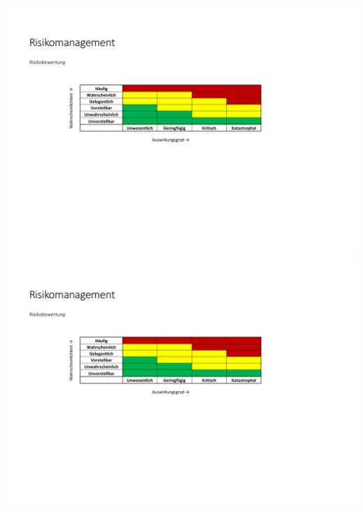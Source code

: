 \begin{landscape}
			\newpage  			
			\includegraphics[page=4,scale=0.90,clip,trim=17mm 22mm 21mm 22mm]{Anhangsdokument/Risikomanagement.pdf}
			\newpage  			
			\includegraphics[page=5,scale=0.90,clip,trim=17mm 22mm 21mm 22mm]{Anhangsdokument/Risikomanagement.pdf}
\newpage	
     \end{landscape} 
     
     
  	 
  	  
  	   
  	  
  	    
  	 
  	 
  	       
  	 
  	 \newpage
  	 
  	 
